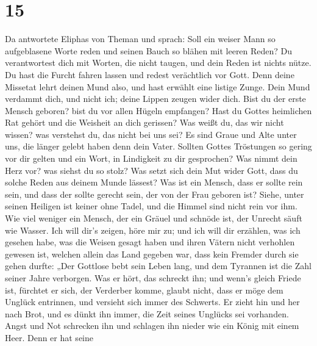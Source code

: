 \hypertarget{section-14}{%
\section{15}\label{section-14}}

 Da antwortete Eliphas von Theman und sprach:
 Soll ein weiser Mann so aufgeblasene Worte reden und
seinen Bauch so blähen mit leeren Reden?  Du verantwortest
dich mit Worten, die nicht taugen, und dein Reden ist nichts nütze.
 Du hast die Furcht fahren lassen und redest verächtlich
vor Gott.  Denn deine Missetat lehrt deinen Mund also, und
hast erwählt eine listige Zunge.  Dein Mund verdammt dich,
und nicht ich; deine Lippen zeugen wider dich.  Bist du
der erste Mensch geboren? bist du vor allen Hügeln empfangen?
 Hast du Gottes heimlichen Rat gehört und die Weisheit an
dich gerissen?  Was weißt du, das wir nicht wissen? was
verstehst du, das nicht bei uns sei?  Es sind Graue und
Alte unter uns, die länger gelebt haben denn dein Vater. 
Sollten Gottes Tröstungen so gering vor dir gelten und ein Wort, in
Lindigkeit zu dir gesprochen?  Was nimmt dein Herz vor?
was siehst du so stolz?  Was setzt sich dein Mut wider
Gott, dass du solche Reden aus deinem Munde lässest?  Was
ist ein Mensch, dass er sollte rein sein, und dass der sollte gerecht
sein, der von der Frau geboren ist?  Siehe, unter seinen
Heiligen ist keiner ohne Tadel, und die Himmel sind nicht rein vor ihm.
 Wie viel weniger ein Mensch, der ein Gräuel und schnöde
ist, der Unrecht säuft wie Wasser.  Ich will dir's
zeigen, höre mir zu; und ich will dir erzählen, was ich gesehen habe,
 was die Weisen gesagt haben und ihren Vätern nicht
verhohlen gewesen ist,  welchen allein das Land gegeben
war, dass kein Fremder durch sie gehen durfte:  „Der
Gottlose bebt sein Leben lang, und dem Tyrannen ist die Zahl seiner
Jahre verborgen.  Was er hört, das schreckt ihn; und
wenn's gleich Friede ist, fürchtet er sich, der Verderber komme,
 glaubt nicht, dass er möge dem Unglück entrinnen, und
versieht sich immer des Schwerts.  Er zieht hin und her
nach Brot, und es dünkt ihn immer, die Zeit seines Unglücks sei
vorhanden.  Angst und Not schrecken ihn und schlagen ihn
nieder wie ein König mit einem Heer.  Denn er hat seine
